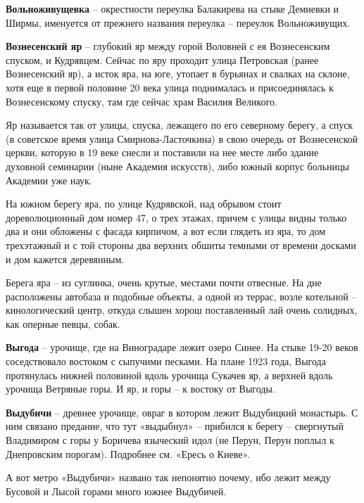 \textbf{Вольноживущевка} – окрестности переулка Балакирева на стыке Демиевки и Ширмы, именуется от прежнего названия переулка – переулок Вольноживущих.\\

\medskip

\textbf{Вознесенский яр} – глубокий яр между горой Воловней с ея Вознесенским спуском, и Кудрявцем. Сейчас по яру проходит улица Петровская (ранее Вознесенский яр), а исток яра, на юге, утопает в бурьянах и свалках на склоне, хотя еще в первой половине 20 века улица поднималась и присоединялась к Вознесенскому спуску, там где сейчас храм Василия Великого. 

Яр называется так от улицы, спуска, лежащего по его северному берегу, а спуск (в советское время улица Смирнова-Ласточкина) в свою очередь от Вознесенской церкви, которую в 19 веке снесли и поставили на нее месте либо здание духовной семинарии (ныне Академия искусств), либо южный корпус больницы Академии уже наук.

На южном берегу яра, по улице Кудрявской, над обрывом стоит дореволюционный дом номер 47, о трех этажах, причем с улицы видны только два и они обложены с фасада кирпичом, а вот если глядеть из яра, то дом трехэтажный и с той стороны два верхних обшиты темными от времени досками и дом кажется деревянным.

Берега яра – из суглинка, очень крутые, местами почти отвесные. На дне расположены автобаза и подобные объекты, а одной из террас, возле котельной – кинологический центр, откуда слышен хорош поставленный лай очень солидных, как оперные певцы, собак.\\

\medskip

\textbf{Выгода} – урочище, где на Виноградаре лежит озеро Синее. На стыке 19-20 веков соседствовало востоком с сыпучими песками. На плане 1923 года, Выгода протянулась нижней половиной вдоль урочища Сукачев яр, а верхней вдоль урочища Ветряные горы. И яр, и горы – к востоку от Выгоды.\\ 

\medskip

\textbf{Выдубичи} – древнее урочище, овраг в котором лежит Выдубицкий монастырь. С ним связано предание, что тут «выдыбнул» – прибился к берегу – свергнутый Владимиром с горы у Боричева языческий идол (не Перун, Перун поплыл к Днепровским порогам). Подробнее см. «Ересь о Киеве».

А вот метро «Выдубичи» названо так непонятно почему, ибо лежит между Бусовой и Лысой горами много южнее Выдубичей.\\

